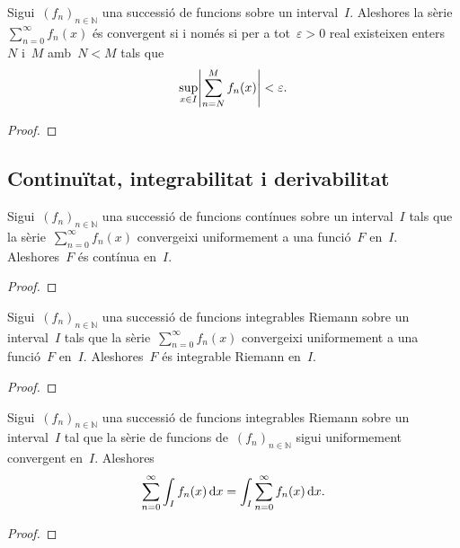 \documentclass[../../main.tex]{subfiles}
\begin{document}
    \begin{theorem}
        \label{def:condició de Cauchy per sèries de funcions}
        Sigui~\((f_{n})_{n\in\mathbb{N}}\) una successió de funcions sobre un interval~\(I\).
        Aleshores la sèrie~\(\sum_{n=0}^{\infty}f_{n}(x)\) és convergent si i només si per a tot~\(\varepsilon>0\) real existeixen enters~\(N\) i~\(M\) amb~\(N<M\) tals que
        \[
            \sup_{x\in I}\abs{\sum_{n=N}^{M}f_{n}(x)}<\varepsilon.
        \]
        \begin{proof}
        \end{proof}
    \end{theorem}
    \subsection{Continuïtat, integrabilitat i derivabilitat}
    \begin{theorem}
        \label{thm:si la sèrie de d'una successió de funcions contínues convergeix uniformement, el seu límit és una funció contínua}
        Sigui~\((f_{n})_{n\in\mathbb{N}}\) una successió de funcions contínues sobre un interval~\(I\) tals que la sèrie~\(\sum_{n=0}^{\infty}f_{n}(x)\) convergeixi uniformement a una funció~\(F\) en~\(I\).
        Aleshores~\(F\) és contínua en~\(I\).
        \begin{proof}
        \end{proof}
    \end{theorem}
    \begin{theorem}
        \label{thm:si la sèrie de d'una successió de funcions integrables Riemann convergeix uniformement, el seu límit és una funció integrable Riemann}
        Sigui~\((f_{n})_{n\in\mathbb{N}}\) una successió de funcions integrables Riemann sobre un interval~\(I\) tals que la sèrie~\(\sum_{n=0}^{\infty}f_{n}(x)\) convergeixi uniformement a una funció~\(F\) en~\(I\).
        Aleshores~\(F\) és integrable Riemann en~\(I\).
        \begin{proof}
        \end{proof}
    \end{theorem}
    \begin{theorem}
        \label{thm:si la sèrie d'una successió de funcions convergeix uniformement aleshores el límit de la integral dels elements de la sèrie de la succesió és la integral del límit del la sèrie de la successió}
        Sigui~\((f_{n})_{n\in\mathbb{N}}\) una successió de funcions integrables Riemann sobre un interval~\(I\) tal que la sèrie de funcions de~\((f_{n})_{n\in\mathbb{N}}\) sigui uniformement convergent en~\(I\).
        Aleshores
        \[
            \sum_{n=0}^{\infty}\int_{I}f_{n}(x)\mathop{}\!\mathrm{d} x=\int_{I}\sum_{n=0}^{\infty}f_{n}(x)\mathop{}\!\mathrm{d} x.
        \]
        \begin{proof}
        \end{proof}
    \end{theorem}
\end{document}

